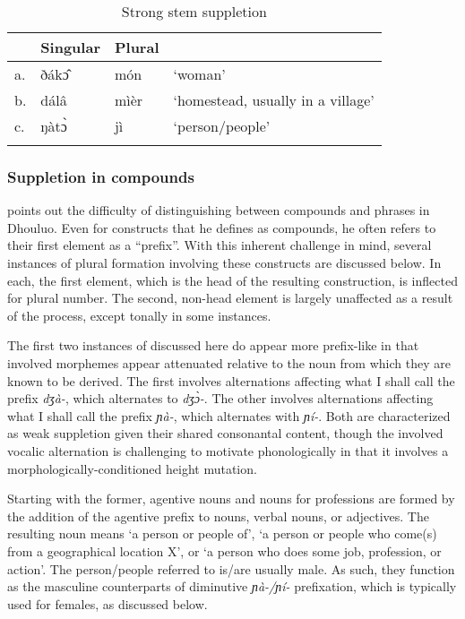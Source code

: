 \documentclass[output=paper,colorlinks,citecolor=brown]{langscibook}
\begin{document}
\begin{table}
\caption{Strong stem suppletion}
\label{tab:StrongStem}
 \begin{tabular}{llll}
  \lsptoprule
& Singular & Plural &  \\
\midrule
a.&ðákɔ̂&	món	&`woman'\\
b.&	dálâ	&mìèr	&`homestead, usually in a village'\\
c.&	ŋàtɔ̀&	jì	&`person/people'\\
  \lspbottomrule
 \end{tabular}
\end{table}   

\subsubsection{Suppletion in compounds}

\citet[115--116]{Gregersen1961} points out the difficulty of distinguishing between  compounds and phrases in Dhouluo. Even for constructs that he defines as compounds, he often refers to their first element as a ``prefix''. With this inherent challenge in mind, several instances of plural formation involving these constructs are discussed below. In each, the first element, which is the head of the resulting construction, is inflected for plural number. The second, non-head element is largely unaffected as a result of the process, except tonally in some instances.

The first two instances of  discussed here do appear more prefix-like in that involved morphemes appear attenuated relative to the noun from which they are known to be derived. The first involves alternations affecting what I shall call the  prefix \textit{dʒà-}, which alternates to \textit{dʒɔ̀-}. The other involves alternations affecting what I shall call the  prefix \textit{ɲà-}, which alternates with \textit{ɲí-}. Both are characterized as weak suppletion given their shared consonantal content, though the involved vocalic alternation is challenging to motivate phonologically in that it involves a morphologically-conditioned height mutation.

Starting with the former, agentive nouns and nouns for professions are formed by the addition of the agentive prefix to nouns, verbal nouns, or adjectives. The resulting noun means `a person or people of', `a person or people who come(s) from a geographical location X', or `a person who does some job, profession, or action'. The person/people referred to is/are usually male. As such, they function as the masculine counterparts of diminutive \textit{ɲà-/ɲí-} prefixation, which is typically used for females, as discussed below.
\end{document}
